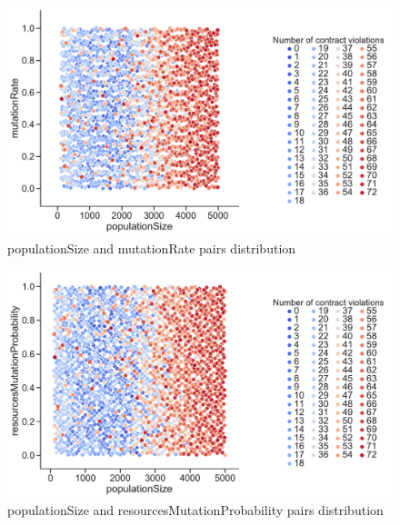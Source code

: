 \clearpage
\begin{figure}
	\centering
	\includegraphics[width=\textwidth]{images/PairsDistr/populationSize_mutationRate.pdf}
	\caption[populationSize and mutationRate pairs distribution]{populationSize and mutationRate pairs distribution}
	\label{fig:populationSize_mutationRate_pair}
\end{figure}
\clearpage
\begin{figure}
	\centering
	\includegraphics[width=\textwidth]{images/PairsDistr/populationSize_resourcesMutationProbability.pdf}
	\caption[populationSize and resourcesMutationProbability pairs distribution]{populationSize and resourcesMutationProbability pairs distribution}
	\label{fig:populationSize_resourcesMutationProbability_pair}
\end{figure}
\clearpage
